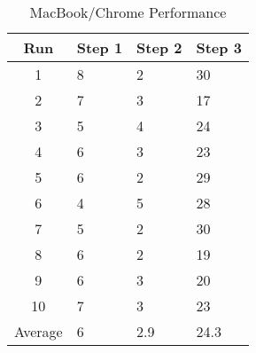 \begin{table}
  \begin{tabular}{| c | l | l | l |}
    \hline
    Run      & Step 1 & Step 2 & Step 3 \\ \hline
    1        & 8      & 2      & 30     \\ \hline
    2        & 7      & 3      & 17     \\ \hline
    3        & 5      & 4      & 24     \\ \hline
    4        & 6      & 3      & 23     \\ \hline
    5        & 6      & 2      & 29     \\ \hline
    6        & 4      & 5      & 28     \\ \hline
    7        & 5      & 2      & 30     \\ \hline
    8        & 6      & 2      & 19     \\ \hline
    9        & 6      & 3      & 20     \\ \hline
    10       & 7      & 3      & 23     \\ \hline
    Average  & 6      & 2.9    & 24.3   \\
    \hline
  \end{tabular}
  \caption{MacBook/Chrome Performance}
  \label{mbChromePerf}
\end{table}